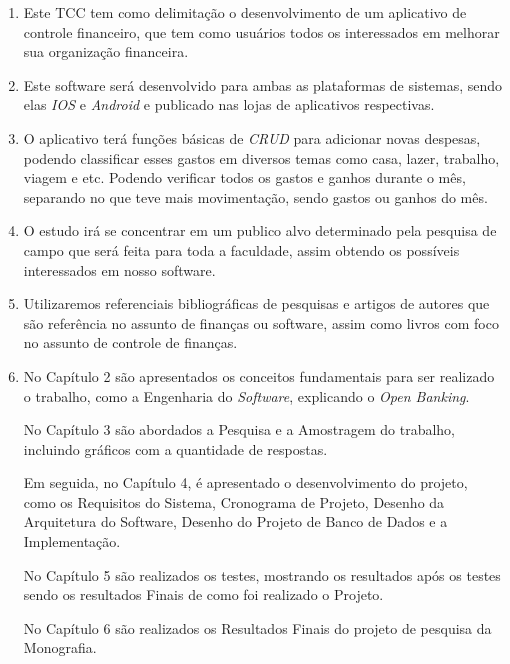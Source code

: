 \begin{enumerate}
    \item Este TCC tem como delimitação o desenvolvimento de um aplicativo de controle financeiro, que tem como usuários todos os interessados em melhorar sua organização financeira.
    \item Este software será desenvolvido para ambas as plataformas de sistemas, sendo elas \textit{IOS} e \textit{Android} e publicado nas lojas de aplicativos respectivas.
    \item O aplicativo terá funções básicas de \textit{CRUD} para adicionar novas despesas, podendo classificar esses gastos em diversos temas como casa, lazer, trabalho, viagem e etc. Podendo verificar todos os gastos e ganhos durante o mês, separando no que teve mais movimentação, sendo gastos ou ganhos do mês.
    \item O estudo irá se concentrar em um publico alvo determinado pela pesquisa de campo que será feita para toda a faculdade, assim obtendo os possíveis interessados em nosso software.
    \item Utilizaremos referenciais bibliográficas de pesquisas e artigos de autores que são referência no assunto de finanças ou software, assim como livros com foco no assunto de controle de finanças.
    \item No Capítulo 2 são apresentados os conceitos fundamentais para ser realizado o trabalho, como a Engenharia do \textit{Software}, explicando o \textit{Open Banking}. 
    
    No Capítulo 3 são abordados a Pesquisa e a Amostragem do trabalho, incluindo gráficos com a quantidade de respostas. 
    
    Em seguida, no Capítulo 4, é apresentado o desenvolvimento do projeto, como os Requisitos do Sistema, Cronograma de Projeto, Desenho da Arquitetura do Software, Desenho do Projeto de Banco de Dados e a Implementação. 
    
    No Capítulo 5 são realizados os testes, mostrando os resultados após os testes sendo os resultados Finais de como foi realizado o Projeto.

    No Capítulo 6 são realizados os Resultados Finais do projeto de pesquisa da Monografia.
\end{enumerate}

